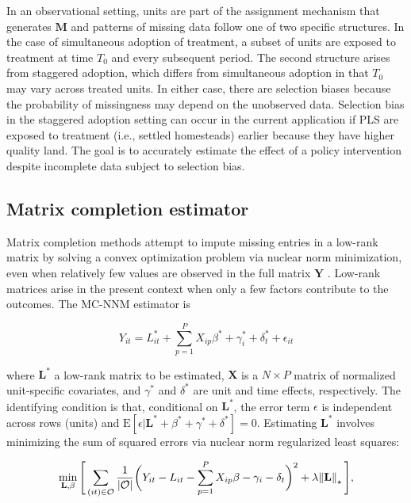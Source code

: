 \documentclass[12pt]{article}
\newcommand{\E}{\mathrm{E}}
\begin{document}
In an observational setting, units are part of the assignment mechanism that generates $\mathbf{M}$ and patterns of missing data follow one of two specific structures. In the case of simultaneous adoption of treatment, a subset of units are exposed to treatment at time $T_0$ and every subsequent period. The second structure arises from staggered adoption, which differs from simultaneous adoption in that $T_0$ may vary across treated units. In either case, there are selection biases because the probability of missingness may depend on the unobserved data. Selection bias in the staggered adoption setting can occur in the current application if PLS are exposed to treatment (i.e., settled homesteads) earlier because they have higher quality land. The goal is to accurately estimate the effect of a policy intervention despite incomplete data subject to selection bias. 

\subsection{Matrix completion estimator}

Matrix completion methods attempt to impute missing entries in a low-rank matrix by solving a convex optimization problem via nuclear norm minimization, even when relatively few values are observed in the full matrix $\mathbf{Y}$ \citep{candes2009exact,candes2010matrix}. Low-rank matrices arise in the present context when only a few factors contribute to the outcomes. The MC-NNM estimator is 

\begin{equation}
Y_{it} = L_{it}^{*} + \sum_{p=1}^{P} X_{ip} \beta^{*} + \gamma_{i}^{*} + \delta_{t}^{*} + \epsilon_{it} \label{eq:mc-Y}
\end{equation}

\noindent
where $\mathbf{L^{*}}$ a low-rank matrix to be estimated, $\mathbf{X}$ is a $N \times P$ matrix of normalized unit-specific covariates, and $\gamma^{*}$ and $\delta^{*}$ are unit and time effects, respectively. The identifying condition is that, conditional on $\mathbf{L^{*}}$, the error term $\epsilon$ is independent across rows (units) and $\E[\epsilon | \mathbf{L^{*}} + \beta^{*} + \gamma^{*} + \delta^{*}] = 0$. Estimating $\mathbf{L^{*}}$ involves minimizing the sum of squared errors via nuclear norm regularized least squares:

\begin{equation}
\min_{\mathbf{L}, \beta} \Bigg[\sum_{(it) \in \mathcal{O}} \frac{1}{|\mathcal{O}|} \bigg(Y_{it} - L_{it} - \sum_{p=1}^{P} X_{ip} \beta - \gamma_{i} - \delta_{t} \bigg)^2 + \lambda \norm{\mathbf{L}}_\star \Bigg], \label{eq:mc-opt}
\end{equation}
\end{document}
